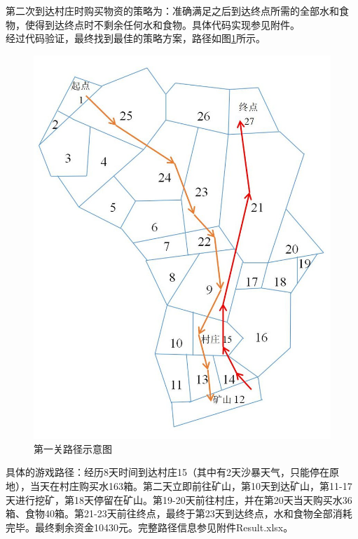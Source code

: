 \documentclass[withoutpre]{cumcmthesis} %
\begin{document}
第二次到达村庄时购买物资的策略为：准确满足之后到达终点所需的全部水和食物，使得到达终点时不剩余任何水和食物。具体代码实现参见附件。\\

经过代码验证，最终找到最佳的策略方案，路径如图\ref{fig:map1word}所示。
\begin{figure}[H]
	\centering
	\includegraphics[scale=0.5]{figures/map1word.jpg}
	\caption{第一关路径示意图}
	\label{fig:map1word}
\end{figure}

具体的游戏路径：经历8天时间到达村庄15（其中有2天沙暴天气，只能停在原地），当天在村庄购买水163箱。第二天立即前往矿山，第10天到达矿山，第11-17天进行挖矿，第18天停留在矿山。第19-20天前往村庄，并在第20天当天购买水36箱、食物40箱。第21-23天前往终点，最终于第23天到达终点，水和食物全部消耗完毕。最终剩余资金10430元。完整路径信息参见附件Result.xlsx。
\end{document}

